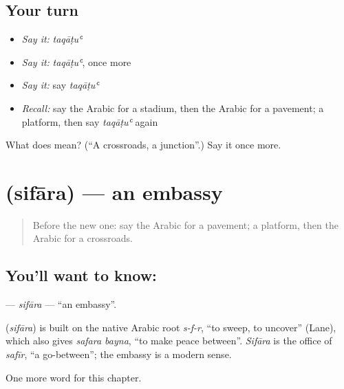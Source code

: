 \subsection*{Your turn}
\begin{itemize}
\raggedright
  \item \emph{Say it:} \emph{taqāṭuʿ}
  \item \emph{Say it:} \emph{taqāṭuʿ}, once more
  \item \emph{Say it:} say \emph{taqāṭuʿ}
  \item \emph{Recall:} say the Arabic for a stadium, then the Arabic for a pavement; a platform, then say \emph{taqāṭuʿ} again
\end{itemize}

\begin{tcolorbox}[breakable,colback=teal!4,colframe=teal!35!black,title={Before you move on}]
What does  mean? (\textquotedblleft{}A crossroads, a junction\textquotedblright{}.) Say it once more.
\end{tcolorbox}
\section[\texorpdfstring{\ar{سفارة} (sifāra)}{سفارة (sifāra)}]{ (sifāra) — an embassy}

\label{lesson:AR-C235-sifara}



\begin{quote}
Before the new one: say the Arabic for a pavement; a platform, then the Arabic for a crossroads.
\end{quote}

\subsection*{You'll want to know: }
\textbf{} — \emph{sifāra} — \textquotedblleft{}an embassy\textquotedblright{}.

\begin{cousinweb}
\textbf{} (\emph{sifāra}) is built on the native Arabic root \emph{s-f-r}, \textquotedblleft{}to sweep, to uncover\textquotedblright{} (Lane), which also gives \emph{safara bayna}, \textquotedblleft{}to make peace between\textquotedblright{}. \emph{Sifāra} is the office of \emph{safīr}, \textquotedblleft{}a go-between\textquotedblright{}; the embassy is a modern sense.
\end{cousinweb}

\begin{grammarlens}[title={What you've built}]
One more word for this chapter.
\end{grammarlens}

